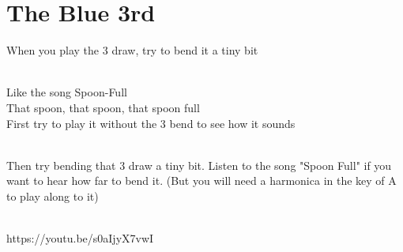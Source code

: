                 
                
    \newpage
    \section{The Blue 3rd}
    When you play the 3 draw, try to bend it a tiny bit
    
    \\
    Like the song Spoon-Full \\
    That spoon, that spoon, that spoon full \\
    First try to play it without the 3 bend to see how it sounds \\
   
    \2 \3 \2 \3 \2 \3 \2
    
    \\
     Then try bending that 3 draw a tiny bit. Listen to the song "Spoon Full" if you want to hear how far to bend it. (But you will need a harmonica in the key of A to play along to it)
     
         \\
https://youtu.be/s0aIjyX7vwI
\\
     \\
    
    \2 \thdb \2 \thdb \2 \thdb \2
    
